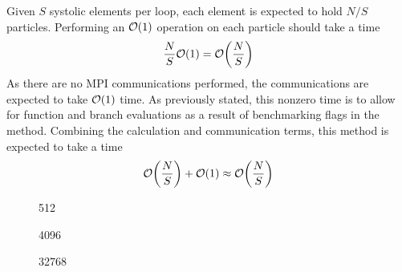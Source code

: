 %

Given $S$ systolic elements per loop, each element is expected to
hold $N/S$ particles.
%
Performing an $\mathcal{O}{\left({ 1 }\right)}$ operation on each particle should take a time
\begin{equation}
    \frac{N}{S}\mathcal{O}{\left({ 1 }\right)} = \mathcal{O}{\left({ \frac{N}{S} }\right)}
\end{equation}
%
As there are no MPI communications performed, the communications are expected
to take $\mathcal{O}{\left({ 1 }\right)}$ time.
%
As previously stated, this nonzero time is to allow for function
and branch evaluations as a result of benchmarking flags in the method.
%
Combining the calculation and communication terms, this method
is expected to take a time
\begin{equation}
    \mathcal{O}{\left({ \frac{N}{S} }\right)} + \mathcal{O}{\left({ 1 }\right)} \approx{} \mathcal{O}{\left({ \frac{N}{S} }\right)}
\end{equation}

%
%
\begin{figure}[!h]
    
    \caption{
        \vZeroTimeCaption
            {\replicatedsystolicloop{}}
            {\individualoperation{}}
            {512}
    }
    \label{fig:v1_replicated_systolic_individual_operation_512_time}
\end  {figure}

\begin{figure}[!h]
    
    \caption{
        \vZeroTimeCaption
            {\replicatedsystolicloop{}}
            {\individualoperation{}}
            {4096}
    }
    \label{fig:v1_replicated_systolic_individual_operation_4096_time}
\end  {figure}

\begin{figure}[!h]
    
    \caption{
        \vZeroTimeCaption
            {\replicatedsystolicloop{}}
            {\individualoperation{}}
            {32768}
    }
    \label{fig:v1_replicated_systolic_individual_operation_32768_time}
\end  {figure}



